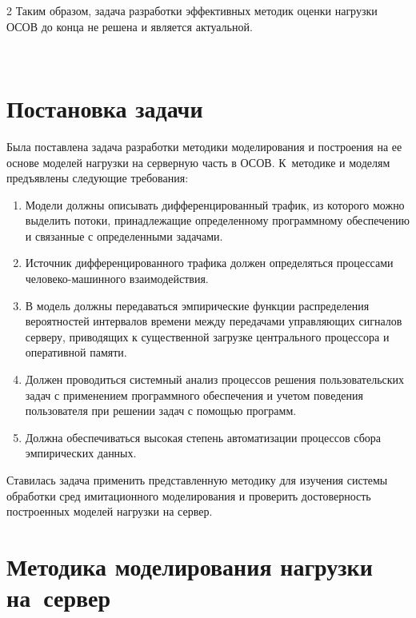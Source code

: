 \begin{multicols}{2}
  Таким образом, задача разработки эффективных методик оценки нагрузки 
ОСОВ до конца не решена и является актуальной. 

\begin{figure}[b] %
 \vspace*{1pt}
 \begin{center}
 \mbox{%
 \epsfxsize=164.097mm
 }
 \end{center}
 \vspace*{-9pt}
\end{figure}
  
\section{Постановка задачи}
  
  Была поставлена задача разработки методики моделирования и построения на 
ее основе моделей нагрузки на серверную часть в ОСОВ. 
К~методике и моделям предъявлены следующие требования:
  \begin{enumerate}[1.]
\item Модели должны описывать дифференци\-ро\-ванный трафик, из которого 
можно выделить\linebreak
 потоки, принадлежащие определенному программному 
обеспечению и связанные с определенными задачами.
\item Источник дифференцированного трафика должен определяться 
процессами человеко-ма\-шин\-но\-го взаимодействия.
\item В модель должны передаваться эмпирические функции распределения 
вероятностей интервалов времени между передачами управляющих сигналов 
серверу, приводящих к существенной загрузке центрального процессора и 
оперативной памяти.
\item Должен проводиться системный анализ процессов решения 
пользовательских задач с применением программного обеспечения и учетом поведения 
пользователя при решении задач с по\-мощью программ.
\item Должна обеспечиваться высокая степень автоматизации процессов сбора 
эмпирических данных.
\end{enumerate}

  Ставилась задача применить представленную методику для изучения системы 
обработки сред имитационного моделирования и проверить достоверность 
построенных моделей нагрузки на сервер.
  
\section{Методика моделирования нагрузки на~сервер}
  

\end{multicols}
